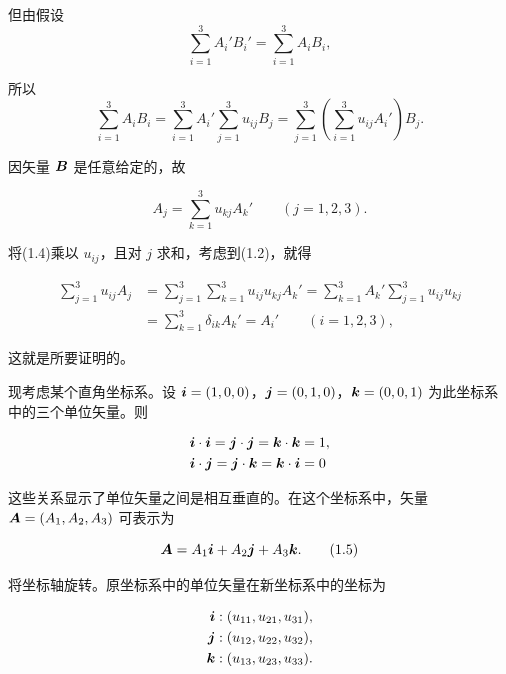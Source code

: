但由假设
\begin{equation*}
\sum_{i=1}^{3} A_i' B_i' = \sum_{i=1}^{3} A_i B_i,
\end{equation*}

所以
\begin{equation*}
\sum_{i=1}^{3} A_i B_i = \sum_{i=1}^{3} A_i' \sum_{j=1}^{3} u_{ij} B_j = \sum_{j=1}^{3} \left(\sum_{i=1}^{3} u_{ij} A_i'\right) B_j.
\end{equation*}

因矢量 $\bm{B}$ 是任意给定的，故

\begin{equation}
A_j = \sum_{k=1}^{3} u_{kj} A_k' \qquad (j = 1, 2, 3).
\tag{1.4}
\end{equation}

将(1.4)乘以 $u_{ij}$，且对 $j$ 求和，考虑到(1.2)，就得

\begin{equation*}
\begin{aligned}
\sum_{j=1}^{3} u_{ij} A_j
&= \sum_{j=1}^{3} \sum_{k=1}^{3} u_{ij} u_{kj} A_k' = \sum_{k=1}^{3} A_k' \sum_{j=1}^{3} u_{ij} u_{kj}\\
&= \sum_{k=1}^{3} \delta_{ik} A_k' = A_i' \qquad (i = 1, 2, 3),
\end{aligned}
\end{equation*}

这就是所要证明的。

现考虑某个直角坐标系。设 $\bm{i} = (1, 0, 0)$，$\bm{j} = (0, 1, 0)$，$\bm{k} = (0, 0, 1)$ 为此坐标系中的三个单位矢量。则

\begin{equation*}
\begin{aligned}
\bm{i} \cdot \bm{i} = \bm{j} \cdot \bm{j} = \bm{k} \cdot \bm{k} &= 1,\\
\bm{i} \cdot \bm{j} = \bm{j} \cdot \bm{k} = \bm{k} \cdot \bm{i} &= 0
\end{aligned}
\end{equation*}

这些关系显示了单位矢量之间是相互垂直的。在这个坐标系中，矢量 $\bm{A} = (A_1, A_2, A_3)$ 可表示为

\begin{equation}
\bm{A} = A_1 \bm{i} + A_2 \bm{j} + A_3 \bm{k}.
\tag{1.5}
\end{equation}

将坐标轴旋转。原坐标系中的单位矢量在新坐标系中的坐标为

\begin{equation*}
\begin{aligned}
\bm{i} &: (u_{11}, u_{21}, u_{31}),\\
\bm{j} &: (u_{12}, u_{22}, u_{32}),\\
\bm{k} &: (u_{13}, u_{23}, u_{33}).
\end{aligned}
\end{equation*}

